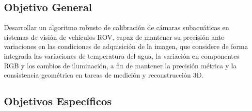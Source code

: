 \documentclass[12pt,letterpaper,spanish,twoside,openright]{report}
\begin{document}
\subsection{Objetivo General}

Desarrollar un algoritmo robusto de calibración de cámaras subacuáticas en sistemas de visión de vehículos ROV, capaz de mantener su precisión ante variaciones en las condiciones de adquisición de la imagen, que considere de forma integrada las variaciones de temperatura del agua, la variación en componentes RGB y los cambios de iluminación, a fin de mantener la precisión métrica y la consistencia geométrica en tareas de medición y reconstrucción 3D.

\subsection{Objetivos Específicos}

\end{document}
